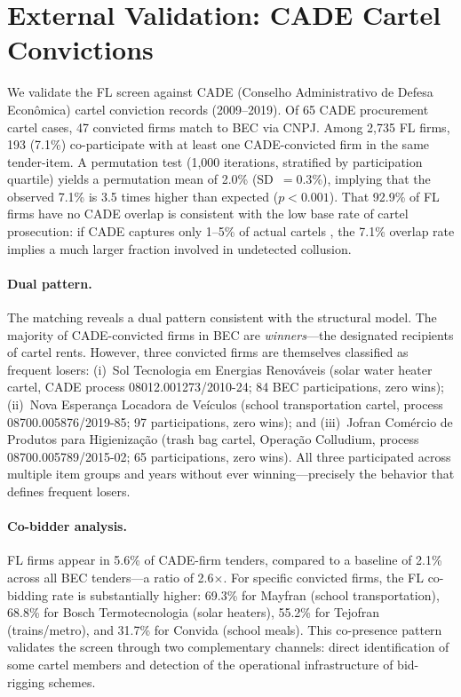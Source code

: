 \section{External Validation: CADE Cartel Convictions}
\label{sec:cade}

We validate the FL screen against CADE (Conselho Administrativo de
Defesa Econ\^omica) cartel conviction records (2009--2019). Of 65
CADE procurement cartel cases, 47 convicted firms match to BEC via
CNPJ. Among 2,735 FL firms, 193 (7.1\%) co-participate with at least
one CADE-convicted firm in the same tender-item. A permutation test
(1,000 iterations, stratified by participation quartile) yields a
permutation mean of 2.0\% (SD~$= 0.3$\%), implying that the observed
7.1\% is 3.5 times higher than expected ($p < 0.001$). That 92.9\%
of FL firms have no CADE overlap is consistent with the low base rate
of cartel prosecution: if CADE captures only 1--5\% of actual cartels
\citep{connor2007price}, the 7.1\% overlap rate implies a much larger
fraction involved in undetected collusion.

\paragraph{Dual pattern.}
The matching reveals a dual pattern consistent with the structural
model. The majority of CADE-convicted firms in BEC are
\emph{winners}---the designated recipients of cartel rents. However,
three convicted firms are themselves classified as frequent losers:
(i)~Sol Tecnologia em Energias Renov\'aveis (solar water heater
cartel, CADE process 08012.001273/2010-24; 84 BEC participations,
zero wins); (ii)~Nova Esperan\c{c}a Locadora de Ve\'iculos (school
transportation cartel, process 08700.005876/2019-85; 97
participations, zero wins); and (iii)~Jofran Com\'ercio de Produtos
para Higieniza\c{c}\~ao (trash bag cartel, Opera\c{c}\~ao Colludium,
process 08700.005789/2015-02; 65 participations, zero wins). All three
participated across multiple item groups and years without ever
winning---precisely the behavior that defines frequent losers.

\paragraph{Co-bidder analysis.}
FL firms appear in 5.6\% of CADE-firm tenders, compared to a baseline
of 2.1\% across all BEC tenders---a ratio of 2.6$\times$. For specific
convicted firms, the FL co-bidding rate is substantially higher:
69.3\% for Mayfran (school transportation), 68.8\% for Bosch
Termotecnologia (solar heaters), 55.2\% for Tejofran (trains/metro),
and 31.7\% for Convida (school meals). This co-presence pattern
validates the screen through two complementary channels: direct
identification of some cartel members and detection of the
operational infrastructure of bid-rigging schemes.

